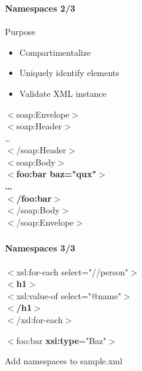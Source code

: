 \documentclass[handout]{beamer}
\begin{document}
\begin{frame}
	\frametitle{\insertsection}
	\framesubtitle{Namespaces 2/3}
	\begin{block}{Purpose}
		\begin{itemize}
			\item Compartimentalize
			\item Uniquely identify elements
			\item Validate XML instance
		\end{itemize}
	\end{block}
	\begin{example}
		$<$soap:Envelope$>$ \\
			\hspace{5mm} $<$soap:Header$>$ \\
				\hspace{10mm} \ldots \\
			\hspace{5mm} $<$/soap:Header$>$ \\
			\hspace{5mm} $<$soap:Body$>$ \\
				\hspace{10mm} \textbf{$<$foo:bar baz="qux"$>$} \\
					\hspace{15mm} \textbf{\ldots} \\
				\hspace{10mm} \textbf{$<$/foo:bar$>$} \\
			\hspace{5mm} $<$/soap:Body$>$ \\
		$<$/soap:Envelope$>$
	\end{example}
\end{frame}

\begin{frame}
	\frametitle{\insertsection}
	\framesubtitle{Namespaces 3/3}
	\begin{example}
		$<$xsl:for-each select="//person"$>$ \\
			\hspace{5mm} \textbf{$<$h1$>$} \\
				\hspace{10mm} $<$xsl:value-of select="@name"$>$ \\
			\hspace{5mm} \textbf{$<$/h1$>$} \\
		$<$/xsl:for-each$>$ \\
	\end{example}
	\begin{example}
		$<$foo:bar \textbf{xsi:type}="Baz"$>$ \\
	\end{example}
	\begin{semiverbatim}
		Add namespaces to sample.xml
	\end{semiverbatim}
\end{frame}
\end{document}
